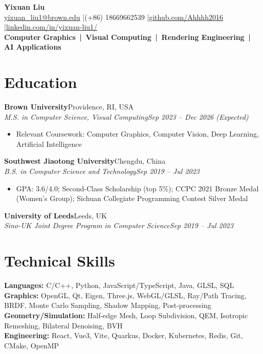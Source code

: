 \documentclass[10pt]{article}
\newcommand{\entry}[4]{\textbf{#1}\hfill #2\\\textit{#3}\hfill\textit{#4}\vspace{0.07em}}
\begin{document}
\small

\begin{center}
  {\Large \textbf{Yixuan Liu}}\\[-0.03em]
  \href{mailto:yixuan_liu1@brown.edu}{yixuan\_liu1@brown.edu}
  \quad|\quad (+86) 18669662539
  \quad|\quad \href{https://github.com/Ahhhh2016}{github.com/Ahhhh2016}
  \quad|\quad \href{https://www.linkedin.com/in/yixuan-liu1/}{linkedin.com/in/yixuan-liu1/}\\[0.02em]
  \textbf{Computer Graphics \,|\, Visual Computing \,|\, Rendering Engineering \,|\, AI Applications}
\end{center}

\section*{Education}
\entry{Brown University}{Providence, RI, USA}{M.S. in Computer Science, Visual Computing}{Sep 2023 -- Dec 2026 (Expected)}
\begin{itemize}
  \item Relevant Coursework: Computer Graphics, Computer Vision, Deep Learning, Artificial Intelligence
\end{itemize}
\entry{Southwest Jiaotong University}{Chengdu, China}{B.S. in Computer Science and Technology}{Sep 2019 -- Jul 2023}
\begin{itemize}
  \item GPA: 3.6/4.0; Second-Class Scholarship (top 5\%); CCPC 2021 Bronze Medal (Women's Group); Sichuan Collegiate Programming Contest Silver Medal
\end{itemize}
\entry{University of Leeds}{Leeds, UK}{Sino-UK Joint Degree Program in Computer Science}{Sep 2019 -- Jul 2023}

\section*{Technical Skills}
\textbf{Languages:} C/C++, Python, JavaScript/TypeScript, Java, GLSL, SQL\\
\textbf{Graphics:} OpenGL, Qt, Eigen, Three.js, WebGL/GLSL, Ray/Path Tracing, BRDF, Monte Carlo Sampling, Shadow Mapping, Post-processing\\
\textbf{Geometry/Simulation:} Half-edge Mesh, Loop Subdivision, QEM, Isotropic Remeshing, Bilateral Denoising, BVH\\
\textbf{Engineering:} React, Vue3, Vite, Quarkus, Docker, Kubernetes, Redis, Git, CMake, OpenMP
\end{document}
